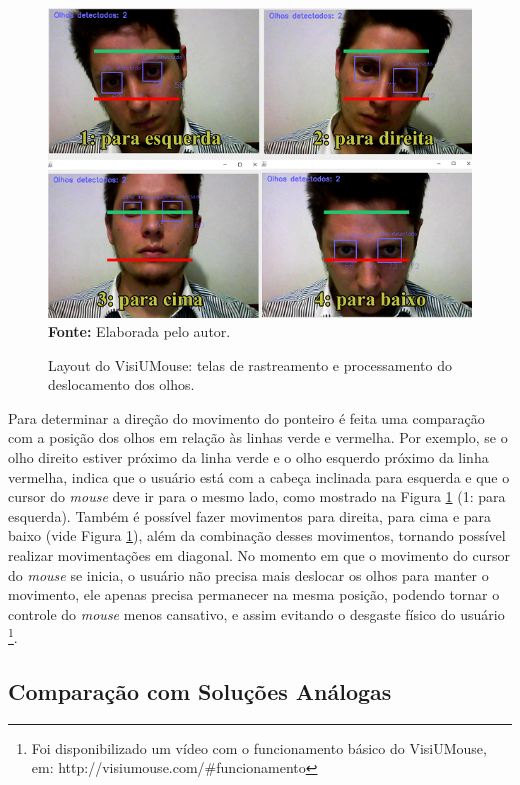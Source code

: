 \begin{figure}[htbp]
\caption{Layout do VisiUMouse: telas de rastreamento e processamento do deslocamento dos olhos.}
\centering \includegraphics[scale=1]{img/funcionamento2.png}
{\fontsize{11}{11}\selectfont \textbf{Fonte:} Elaborada pelo autor.}
\label{fig:funcionamento}
\end{figure}

Para determinar a direção do movimento do ponteiro é feita uma comparação com a posição dos olhos em relação às linhas verde e vermelha. Por exemplo, se o olho direito estiver próximo da linha verde e o olho esquerdo próximo da linha vermelha, indica que o usuário está com a cabeça inclinada para esquerda e que o cursor do \textit{mouse} deve ir para o mesmo lado, como mostrado na Figura \ref{fig:funcionamento} (1: para esquerda). Também é possível fazer movimentos para direita, para cima e para baixo (vide Figura \ref{fig:funcionamento}), além da combinação desses movimentos, tornando possível realizar movimentações em diagonal. No momento em que o movimento do cursor do \textit{mouse} se inicia, o usuário não precisa mais deslocar os olhos para manter o movimento, ele apenas precisa permanecer na mesma posição, podendo tornar o controle do \textit{mouse} menos cansativo, e assim evitando o desgaste físico do usuário \footnote{Foi disponibilizado um vídeo com o funcionamento básico do VisiUMouse, em: http://visiumouse.com/\#funcionamento}. 




\subsection{Comparação com Soluções Análogas}\label{Sub:tabela-comparativa}


